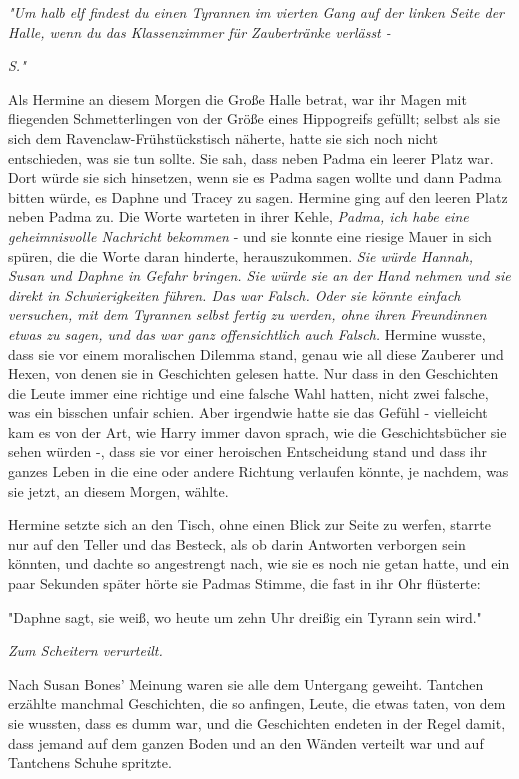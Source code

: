 {\emph{"Um halb elf findest du einen Tyrannen im vierten Gang auf der linken Seite der Halle, wenn du das Klassenzimmer für Zaubertränke verlässt -}

\emph{S."}

Als Hermine an diesem Morgen die Große Halle betrat, war ihr Magen mit fliegenden Schmetterlingen von der Größe eines Hippogreifs gefüllt; selbst als sie sich dem Ravenclaw-Frühstückstisch näherte, hatte sie sich noch nicht entschieden, was sie tun sollte. Sie sah, dass neben Padma ein leerer Platz war. Dort würde sie sich hinsetzen, wenn sie es Padma sagen wollte und dann Padma bitten würde, es Daphne und Tracey zu sagen. Hermine ging auf den leeren Platz neben Padma zu. Die Worte warteten in ihrer Kehle, \emph{Padma, ich habe eine geheimnisvolle Nachricht bekommen} - und sie konnte eine riesige Mauer in sich spüren, die die Worte daran hinderte, herauszukommen. \emph{Sie würde Hannah, Susan und Daphne in Gefahr bringen. Sie würde sie an der Hand nehmen und sie direkt in Schwierigkeiten führen. Das war Falsch. Oder sie könnte einfach versuchen, mit dem Tyrannen selbst fertig zu werden, ohne ihren Freundinnen etwas zu sagen, und das war ganz offensichtlich auch Falsch.} Hermine wusste, dass sie vor einem moralischen Dilemma stand, genau wie all diese Zauberer und Hexen, von denen sie in Geschichten gelesen hatte. Nur dass in den Geschichten die Leute immer eine richtige und eine falsche Wahl hatten, nicht zwei falsche, was ein bisschen unfair schien. Aber irgendwie hatte sie das Gefühl - vielleicht kam es von der Art, wie Harry immer davon sprach, wie die Geschichtsbücher sie sehen würden -, dass sie vor einer heroischen Entscheidung stand und dass ihr ganzes Leben in die eine oder andere Richtung verlaufen könnte, je nachdem, was sie jetzt, an diesem Morgen, wählte.

Hermine setzte sich an den Tisch, ohne einen Blick zur Seite zu werfen, starrte nur auf den Teller und das Besteck, als ob darin Antworten verborgen sein könnten, und dachte so angestrengt nach, wie sie es noch nie getan hatte, und ein paar Sekunden später hörte sie Padmas Stimme, die fast in ihr Ohr flüsterte:

"Daphne sagt, sie weiß, wo heute um zehn Uhr dreißig ein Tyrann sein wird."

\emph{Zum Scheitern verurteilt.}

Nach Susan Bones' Meinung waren sie alle dem Untergang geweiht. Tantchen erzählte manchmal Geschichten, die so anfingen, Leute, die etwas taten, von dem sie wussten, dass es dumm war, und die Geschichten endeten in der Regel damit, dass jemand auf dem ganzen Boden und an den Wänden verteilt war und auf Tantchens Schuhe spritzte.

}
